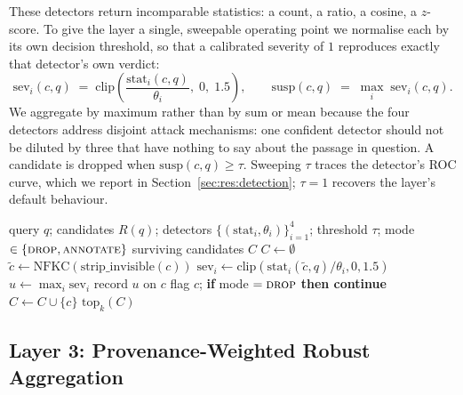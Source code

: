 These detectors return incomparable statistics: a count, a ratio, a cosine, a $z$-score. To
give the layer a single, sweepable operating point we normalise each by its own decision
threshold, so that a calibrated severity of $1$ reproduces exactly that detector's own verdict:
\begin{equation}
\mathrm{sev}_i(c, q) \;=\; \mathrm{clip}\!\left(\frac{\mathrm{stat}_i(c, q)}{\theta_i},\; 0,\; 1.5\right),
\qquad
\mathrm{susp}(c, q) \;=\; \max_i \; \mathrm{sev}_i(c, q).
\label{eq:suspicion}
\end{equation}
We aggregate by maximum rather than by sum or mean because the four detectors address disjoint
attack mechanisms: one confident detector should not be diluted by three that have nothing to
say about the passage in question. A candidate is dropped when $\mathrm{susp}(c,q) \ge \tau$.
Sweeping $\tau$ traces the detector's ROC curve, which we report in
Section~\ref{sec:res:detection}; $\tau = 1$ recovers the layer's default behaviour.

\begin{algorithm}[H]
\caption{Layer 2: calibrated retrieval filtering}
\label{alg:l2}
\begin{algorithmic}[1]
\Require query $q$; candidates $R(q)$; detectors $\{(\mathrm{stat}_i, \theta_i)\}_{i=1}^{4}$;
threshold $\tau$; mode $\in \{\textsc{drop}, \textsc{annotate}\}$
\Ensure surviving candidates $C$
\State $C \gets \emptyset$
  \State $\tilde{c} \gets \mathrm{NFKC}(\mathrm{strip\_invisible}(c))$ 
     \State $\mathrm{sev}_i \gets \mathrm{clip}(\mathrm{stat}_i(\tilde{c}, q) / \theta_i, 0, 1.5)$
  \EndFor
  \State $u \gets \max_i \mathrm{sev}_i$ 
  \State record $u$ on $c$ 
     \State flag $c$; \textbf{if} mode $=\textsc{drop}$ \textbf{then continue}
  \EndIf
  \State $C \gets C \cup \{c\}$
\EndFor
\State \Return $\mathrm{top}_k(C)$ 
\end{algorithmic}
\end{algorithm}

\subsection{Layer 3: Provenance-Weighted Robust Aggregation}
\label{sec:l3}

